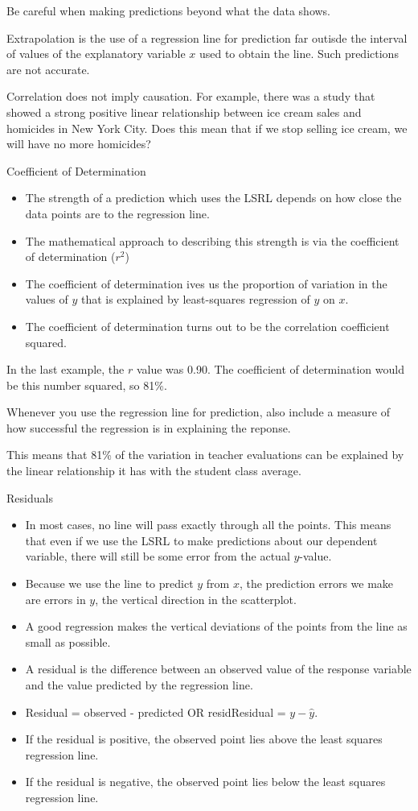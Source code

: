 \documentclass[../stats.tex]{subfiles}
\begin{document}
Be careful when making predictions beyond what the data shows.

Extrapolation is the use of a regression line for prediction far outisde the interval of values of the explanatory variable $x$ used to obtain the line. Such predictions are not accurate.

Correlation does not imply causation. For example, there was a study that showed a strong positive linear relationship between ice cream sales and homicides in New York City. Does this mean that if we stop selling ice cream, we will have no more homicides?

Coefficient of Determination 
\begin{itemize}
    \item The strength of a prediction which uses the LSRL depends on how close the data points are to the regression line.
    \item The mathematical approach to describing this strength is via the coefficient of determination ($r^2$)
    \item The coefficient of determination ives us the proportion of variation in the values of $y$ that is explained by least-squares regression of $y$ on $x$.
    \item The coefficient of determination turns out to be the correlation coefficient squared.
\end{itemize}

In the last example, the $r$ value was 0.90. The coefficient of determination would be this number squared, so 81\%.

Whenever you use the regression line for prediction, also include a measure of how successful the regression is in explaining the reponse.

This means that 81\% of the variation in teacher evaluations can be explained by the linear relationship it has with the student class average.

Residuals 
\begin{itemize}
    \item In most cases, no line will pass exactly through all the points. This means that even if we use the LSRL to make predictions about our dependent variable, there will still be some error from the actual $y$-value.
    \item Because we use the line to predict $y$ from $x$, the prediction errors we make are errors in $y$, the vertical direction in the scatterplot.
    \item A good regression makes the vertical deviations of the points from the line as small as possible.
    \item A residual is the difference between an observed value of the response variable and the value predicted by the regression line.
    \item Residual = observed - predicted OR residResidual = $y-\hat{y}$.
    \item If the residual is positive, the observed point lies above the least squares regression line.
    \item If the residual is negative, the observed point lies below the least squares regression line.
\end{itemize}
\end{document}
